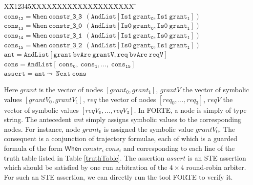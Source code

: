 \documentclass[final]{IEEEtran}
\newlength{\fminilength}
\newenvironment{fmini}[1][\linewidth]
  {\setlength{\fminilength}{#1\fboxsep-2\fboxrule}%
   \vspace{2ex}\noindent\begin{lrbox}{\fminibox}\begin{minipage}{\fminilength}%
   \mbox{ }\hfill\vspace{-2.5ex}}%
  {\end{minipage}\end{lrbox}\vspace{1ex}\hspace{0ex}%
   \framebox{\usebox{\fminibox}}}
\newenvironment{specification}
{\noindent\footnotesize\tt\begin{fmini}\begin{tabbing}X\=X12345\=XXXX\=XXXX\=XXXX\=XXXX\=XXXX
\=\+\kill} {\end{tabbing}\normalfont\end{fmini}}
\begin{document}
\begin{center}
\begin{table}
\begin{specification}
$\mathtt{cons_{12}=When\ constr\_3\_3\   \ ( AndList [Is1\  grant_0,Is1\  grant_1])}$\\

$\mathtt{cons_{13}=When\ constr\_3\_0\   \ (AndList [Is0\
grant_0,Is0\
grant_1])}$\\

$\mathtt{cons_{14}=When\ constr\_3\_1\   \ ( AndList
[Is1\  grant_0,Is0\  grant_1])}$\\

$\mathtt{cons_{15}=When\ constr\_3\_2\
   \ (AndList [Is0\  grant_0,Is1\  grant_1])}$\\

$\mathtt{ant=AndList [grant\ bvAre\ grantV,req\ bvAre\ reqV]}$\\

$\mathtt{cons= AndList [ \ cons_0,  \ cons_1,..., \ cons_{15}]}$\\

$\mathtt{assert=ant \leadsto \ Next\ cons}$\\



\end{specification}
\end{table}
\end{center}


Here   $grant$ is the vector of nodes  $[grant_0,grant_1]$, $grantV$
the vector of symbolic values $[grantV_0,grantV_1]$, $req$ the vector
of nodes  $[req_0,...,req_3]$, $reqV$ the vector of symbolic values
$[reqV_0,...,reqV_3]$. In FORTE, a node is simply of type string.
The antecedent $ant$ simply assigns symbolic values to the
corresponding nodes. For instance, node $grant_0$ is assigned the
symbolic value $grantV_0$. The consequent is a conjunction of
trajectory formulae, each of which is a guarded formula of the form
$\mathsf{When} \ constr_i \ cons_i$ and corresponding to each line
of the truth table listed in Table \ref{truthTable}. The assertion
$assert$ is an STE assertion which should be satisfied by one run
arbitration of the $4 \times 4$ round-robin
 arbiter. For such an STE assertion, we can directly run the tool
 FORTE to verify it.
\end{document}
